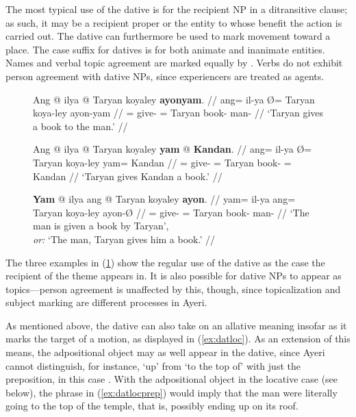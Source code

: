 The most typical use of the dative is for the recipient NP in a ditransitive
clause; as such, it may be a recipient proper or the entity to whose benefit
the action is carried out. The dative can furthermore be used to mark movement
toward a place. The case suffix for datives is  for both
animate and inanimate entities. Names and verbal topic agreement are marked
equally by . Verbs do not exhibit person agreement with dative
NPs, since experiencers are treated as agents.

\begin{figure}[h]
\pex\label{ex:datregular}
\a\begingl
	\gla Ang @ ilya {} @ Taryan koyaley \textbf{ayonyam}. //
	\glb ang= il-ya Ø= Taryan koya-ley ayon-yam //
	\glc \AgtT{}= give-\TsgM{} \Top{}= Taryan book-\PargI{} 
		man-\Dat{} //
	\glft `Taryan gives a book to the man.' //
\endgl

\a\begingl
	\gla Ang @ ilya {} @ Taryan koyaley \textbf{yam} @ \textbf{Kandan}. //
	\glb ang= il-ya Ø= Taryan koya-ley yam= Kandan //
	\glc \AgtT{}= give-\TsgM{} \Top{}= Taryan book-\PargI{} \Dat{}= Kandan //
	\glft `Taryan gives Kandan a book.' //
\endgl

\a\begingl
	\gla \textbf{Yam} @ ilya ang @ Taryan koyaley \textbf{ayon}. //
	\glb yam= il-ya ang= Taryan koya-ley ayon-Ø //
	\glc \DatT{}= give-\TsgM{} \Aarg{}= Taryan book-\PargI{} man-\Top{} //
	\glft `The man is given a book by Taryan',\\
		\textit{or:} `The man, Taryan gives him a book.' //
\endgl
\xe
\end{figure}

The three examples in (\ref{ex:datregular}) show the regular use of the dative
as the case the recipient of the theme appears in. It is also possible for
dative NPs to appear as topics---person agreement is unaffected by this,
though, since topicalization and subject marking are different processes in
Ayeri.

As mentioned above, the dative can also take on an allative meaning insofar as
it marks the target of a motion, as displayed in (\ref{ex:datloc}). As an
extension of this means, the adpositional object may as well appear in the
dative, since Ayeri cannot distinguish, for instance, `up' from `to the top of'
with just the preposition, in this case . With the
adpositional object in the locative case (see below), the phrase in
(\ref{ex:datlocprep}) would imply that the man were literally going to the top
of the temple, that is, possibly ending up on its roof.

